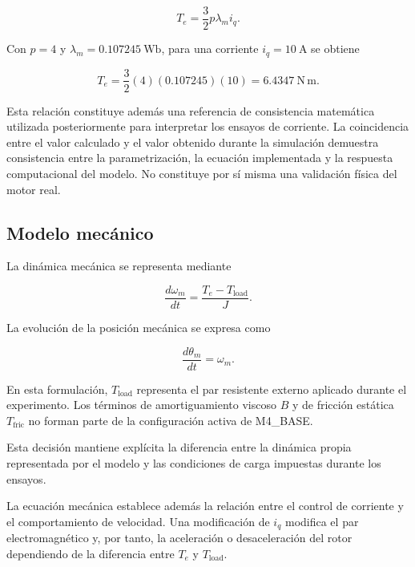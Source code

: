 \begin{equation}
T_e=
\frac{3}{2}p\lambda_m i_q.
\end{equation}

Con $p=4$ y $\lambda_m=0.107245~\mathrm{Wb}$, para una corriente $i_q=10~\mathrm{A}$ se obtiene

\begin{equation}
T_e
=
\frac{3}{2}(4)(0.107245)(10)
=
6.4347~\mathrm{N\,m}.
\end{equation}

Esta relación constituye además una referencia de consistencia matemática utilizada posteriormente para interpretar los ensayos de corriente. La coincidencia entre el valor calculado y el valor obtenido durante la simulación demuestra consistencia entre la parametrización, la ecuación implementada y la respuesta computacional del modelo. No constituye por sí misma una validación física del motor real.

\subsection{Modelo mecánico}

La dinámica mecánica se representa mediante

\begin{equation}
\frac{d\omega_m}{dt}
=
\frac{T_e-T_{\mathrm{load}}}{J}.
\end{equation}

La evolución de la posición mecánica se expresa como

\begin{equation}
\frac{d\theta_m}{dt}
=
\omega_m.
\end{equation}

En esta formulación, $T_{\mathrm{load}}$ representa el par resistente externo aplicado durante el experimento. Los términos de amortiguamiento viscoso $B$ y de fricción estática $T_{\mathrm{fric}}$ no forman parte de la configuración activa de M4\_BASE.

Esta decisión mantiene explícita la diferencia entre la dinámica propia representada por el modelo y las condiciones de carga impuestas durante los ensayos.

La ecuación mecánica establece además la relación entre el control de corriente y el comportamiento de velocidad. Una modificación de $i_q$ modifica el par electromagnético y, por tanto, la aceleración o desaceleración del rotor dependiendo de la diferencia entre $T_e$ y $T_{\mathrm{load}}$.

